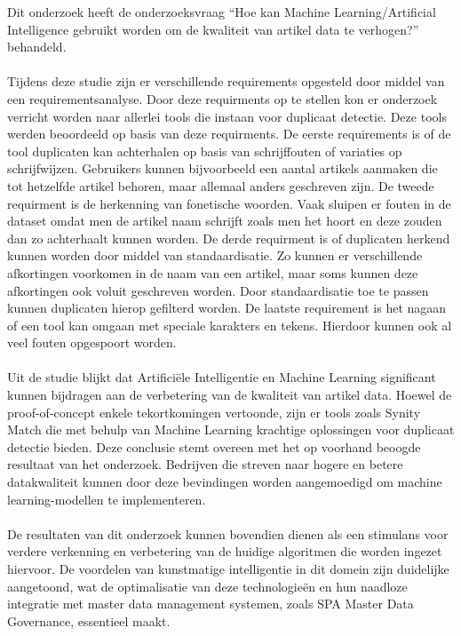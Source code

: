 Dit onderzoek heeft de onderzoeksvraag “Hoe kan Machine Learning/Artificial Intelligence gebruikt worden om de kwaliteit van artikel data te verhogen?” behandeld. 
\\ \\Tijdens deze studie zijn er verschillende requirements opgesteld door middel van een requirementsanalyse. Door deze requirments op te stellen kon er onderzoek verricht worden naar allerlei tools die instaan voor duplicaat detectie. Deze tools werden beoordeeld op basis van deze requirments. De eerste requirements is of de tool duplicaten kan achterhalen op basis van schrijffouten of variaties op schrijfwijzen. Gebruikers kunnen bijvoorbeeld een aantal artikels aanmaken die tot hetzelfde artikel behoren, maar allemaal anders geschreven zijn. De tweede requirment is de herkenning van fonetische woorden. Vaak sluipen er fouten in de dataset omdat men de artikel naam schrijft zoals men het hoort en deze zouden dan zo achterhaalt kunnen worden. De derde requirment is of duplicaten herkend kunnen worden door middel van standaardisatie. Zo kunnen er verschillende afkortingen voorkomen in de naam van een artikel, maar soms kunnen deze afkortingen ook voluit geschreven worden. Door standaardisatie toe te passen kunnen duplicaten hierop gefilterd worden. De laatste requirement is het nagaan of een tool kan omgaan met speciale karakters en tekens. Hierdoor kunnen ook al veel fouten opgespoort worden.
\\ \\Uit de studie blijkt dat Artificiële Intelligentie en Machine Learning significant kunnen bijdragen aan de verbetering  van de kwaliteit van artikel data. Hoewel de proof-of-concept enkele tekortkomingen vertoonde, zijn er tools zoals Synity Match die met behulp van Machine Learning krachtige oplossingen voor duplicaat detectie bieden. Deze conclusie stemt overeen met het op voorhand beoogde resultaat van het onderzoek. Bedrijven die streven naar hogere en betere datakwaliteit kunnen door deze bevindingen worden aangemoedigd om machine learning-modellen te implementeren.
\\ \\De resultaten van dit onderzoek kunnen bovendien dienen als een stimulans voor verdere verkenning en verbetering van de huidige algoritmen die worden ingezet hiervoor. De voordelen van kunstmatige intelligentie in dit domein zijn duidelijke aangetoond, wat de optimalisatie van deze technologieën en hun naadloze integratie met master data management systemen, zoals SPA Master Data Governance, essentieel maakt.
